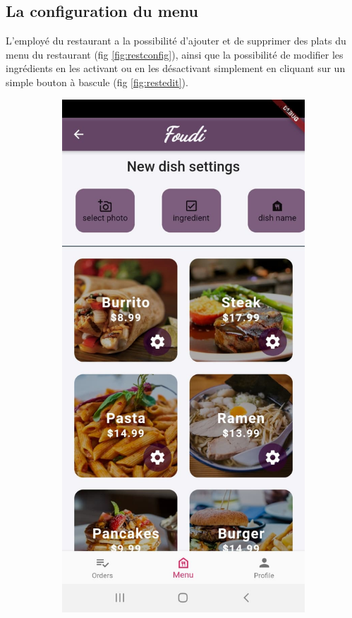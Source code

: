 \documentclass[french, a4paper, 12pt]{report}
\begin{document}
		\subsection{La configuration du menu} L'employé du restaurant a la possibilité d'ajouter et de supprimer des plats du menu du restaurant (fig \ref{fig:restconfig}), ainsi que la possibilité de modifier les ingrédients en les activant ou en les désactivant simplement en cliquant sur un simple bouton à bascule (fig \ref{fig:restedit}).
		
		\newpage

\begin{figure}[h!]
\centering
\begin{subfigure}{.5\textwidth}
  \centering
  \includegraphics[width=.9\linewidth]{screenshots/Restaurantviews/MenuSetup.jpg}

\end{subfigure}
\end{figure}
\end{document}

